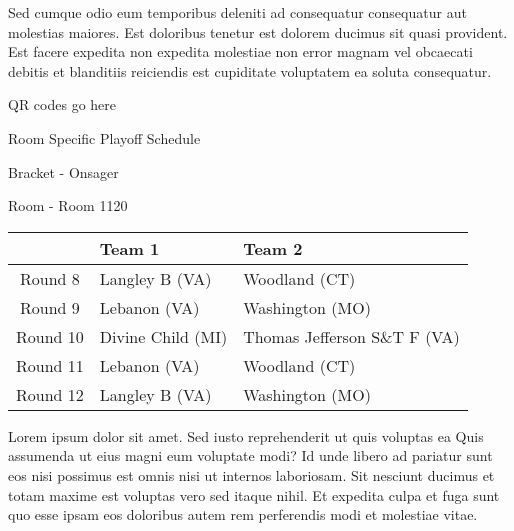 \documentclass{article}%
\begin{document}
\newline%
Sed cumque odio eum temporibus deleniti ad consequatur consequatur aut molestias maiores. Est doloribus tenetur est dolorem ducimus sit quasi provident. Est facere expedita non expedita molestiae non error magnam vel obcaecati debitis et blanditiis reiciendis est cupiditate voluptatem ea soluta consequatur.%
\vspace*{140pt}%
\begin{center}%
\begin{Huge}%
QR codes go here%
\end{Huge}%
\end{center}%
\newpage%
\begin{center}%
\begin{Huge}%
Room Specific Playoff Schedule%
\end{Huge}%
\vspace*{8pt}%
\linebreak%
\begin{Large}%
Bracket {-} Onsager%
\end{Large}%
\vspace*{8pt}%
\linebreak%
\vspace*{8pt}%
\begin{Large}%
Room {-} Room 1120%
\end{Large}%
\end{center}%
%
\begin{tabularx}{\textwidth}{|c|Y|Y|}%
\hline%
&Team 1&Team 2\\%
\hline%
Round 8&Langley B (VA)&Woodland (CT)\\%
Round 9&Lebanon (VA)&Washington (MO)\\%
Round 10&Divine Child (MI)&Thomas Jefferson S\&T F (VA)\\%
Round 11&Lebanon (VA)&Woodland (CT)\\%
Round 12&Langley B (VA)&Washington (MO)\\%
\hline%
\end{tabularx}%
\vspace*{8pt}%
\newline%
Lorem ipsum dolor sit amet. Sed iusto reprehenderit ut quis voluptas ea Quis assumenda ut eius magni eum voluptate modi? Id unde libero ad pariatur sunt eos nisi possimus est omnis nisi ut internos laboriosam. Sit nesciunt ducimus et totam maxime est voluptas vero sed itaque nihil. Et expedita culpa et fuga sunt quo esse ipsam eos doloribus autem rem perferendis modi et molestiae vitae.\newline%
\end{document}
